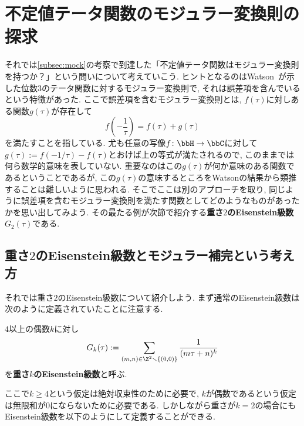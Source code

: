 \documentclass[11pt,b5paper,oneside,lualatex]{ltjsarticle} %
\numberwithin{equation}{section} %
\begin{document}

\section{不定値テータ関数のモジュラー変換則の探求} \label{sec:indefinite_theta}


それでは\cref{subsec:mock}の考察で到達した「不定値テータ関数はモジュラー変換則を持つか？」という問いについて考えていこう. 
ヒントとなるのはWatson~\cite[pp. 78]{Watson}が示した位数$ 3 $のテータ関数に対するモジュラー変換則で, それは誤差項を含んでいるという特徴があった.
ここで誤差項を含むモジュラー変換則とは, $ f(\tau) $に対しある関数$ g(\tau) $が存在して
\[
f \left( -\frac{1}{\tau} \right) = f(\tau) + g(\tau)
\]
を満たすことを指している. 
尤も任意の写像$ f \colon \bbH \to \bbC $に対して$ g(\tau) := f(-1/\tau) - f(\tau) $とおけば上の等式が満たされるので, このままでは何ら数学的意味を表していない. 
重要なのはこの$ g(\tau) $が何か意味のある関数であるということであるが, この$ g(\tau) $の意味するところをWatsonの結果から類推することは難しいように思われる. 
そこでここは別のアプローチを取り, 同じように誤差項を含むモジュラー変換則を満たす関数としてどのようなものがあったかを思い出してみよう. 
その最たる例が次節で紹介する\textbf{重さ$ 2 $のEisenstein級数}$ G_2(\tau) $である. 


\subsection{重さ$ 2 $のEisenstein級数とモジュラー補完という考え方} \label{subsec:modular_completion}


それでは重さ$ 2 $のEisenstein級数について紹介しよう. 
まず通常のEisenstein級数は次のように定義されていたことに注意する. 

\begin{dfn}
	$ 4 $以上の偶数$ k $に対し
	\[
	G_k (\tau) := \sum_{(m, n) \in \Z^2 \smallsetminus \{ (0, 0) \}} \frac{1}{(m\tau + n)^k}
	\]
	を\textbf{重さ$ k $のEisenstein級数}と呼ぶ. 
\end{dfn}

ここで$ k \ge 4 $という仮定は絶対収束性のために必要で, $ k $が偶数であるという仮定は無限和が$ 0 $にならないために必要である. 
しかしながら重さが$ k=2 $の場合にもEisenstein級数を以下のようにして定義することができる. 
\end{document}
